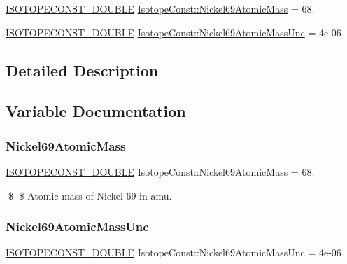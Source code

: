 \begin{DoxyCompactItemize}
\item 
\mbox{\hyperlink{group___isotope_const-_macros_ga8f45a7272ce02c0b4c65c44636ed719a}{I\+S\+O\+T\+O\+P\+E\+C\+O\+N\+S\+T\+\_\+\+D\+O\+U\+B\+LE}} \mbox{\hyperlink{group___isotope_const-_nickel-_ni69_ga3094816b4f454a9b66b994eefc7942e7}{Isotope\+Const\+::\+Nickel69\+Atomic\+Mass}} = 68.
\item 
\mbox{\hyperlink{group___isotope_const-_macros_ga8f45a7272ce02c0b4c65c44636ed719a}{I\+S\+O\+T\+O\+P\+E\+C\+O\+N\+S\+T\+\_\+\+D\+O\+U\+B\+LE}} \mbox{\hyperlink{group___isotope_const-_nickel-_ni69_ga4f1aa034633a4de0e8625a566e4078bf}{Isotope\+Const\+::\+Nickel69\+Atomic\+Mass\+Unc}} = 4e-\/06
\end{DoxyCompactItemize}


\subsection{Detailed Description}


\subsection{Variable Documentation}
\mbox{\label{group___isotope_const-_nickel-_ni69_ga3094816b4f454a9b66b994eefc7942e7}} 
\subsubsection{\texorpdfstring{Nickel69\+Atomic\+Mass}{Nickel69AtomicMass}}
{\footnotesize\ttfamily \mbox{\hyperlink{group___isotope_const-_macros_ga8f45a7272ce02c0b4c65c44636ed719a}{I\+S\+O\+T\+O\+P\+E\+C\+O\+N\+S\+T\+\_\+\+D\+O\+U\+B\+LE}} Isotope\+Const\+::\+Nickel69\+Atomic\+Mass = 68.}

\$ \$ Atomic mass of Nickel-\/69 in amu. \mbox{\label{group___isotope_const-_nickel-_ni69_ga4f1aa034633a4de0e8625a566e4078bf}} 
\subsubsection{\texorpdfstring{Nickel69\+Atomic\+Mass\+Unc}{Nickel69AtomicMassUnc}}
{\footnotesize\ttfamily \mbox{\hyperlink{group___isotope_const-_macros_ga8f45a7272ce02c0b4c65c44636ed719a}{I\+S\+O\+T\+O\+P\+E\+C\+O\+N\+S\+T\+\_\+\+D\+O\+U\+B\+LE}} Isotope\+Const\+::\+Nickel69\+Atomic\+Mass\+Unc = 4e-\/06}

